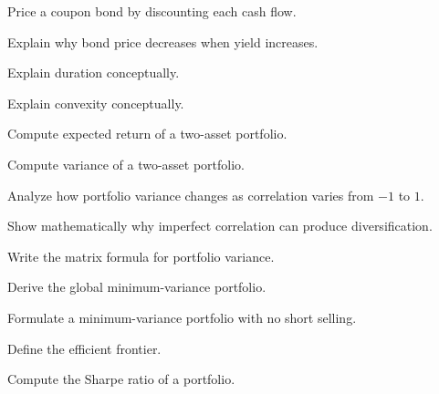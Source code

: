 \begin{exercise}[3]
Price a coupon bond by discounting each cash flow.
\end{exercise}

\begin{exercise}[3]
Explain why bond price decreases when yield increases.
\end{exercise}

\begin{exercise}[2]
Explain duration conceptually.
\end{exercise}

\begin{exercise}[2]
Explain convexity conceptually.
\end{exercise}

\begin{exercise}[2]
Compute expected return of a two-asset portfolio.
\end{exercise}

\begin{exercise}[2]
Compute variance of a two-asset portfolio.
\end{exercise}

\begin{exercise}[3]
Analyze how portfolio variance changes as correlation varies from \(-1\) to
\(1\).
\end{exercise}

\begin{exercise}[3]
Show mathematically why imperfect correlation can produce diversification.
\end{exercise}

\begin{exercise}[2]
Write the matrix formula for portfolio variance.
\end{exercise}

\begin{exercise}[3]
Derive the global minimum-variance portfolio.
\end{exercise}

\begin{exercise}[3]
Formulate a minimum-variance portfolio with no short selling.
\end{exercise}

\begin{exercise}[2]
Define the efficient frontier.
\end{exercise}

\begin{exercise}[2]
Compute the Sharpe ratio of a portfolio.
\end{exercise}


